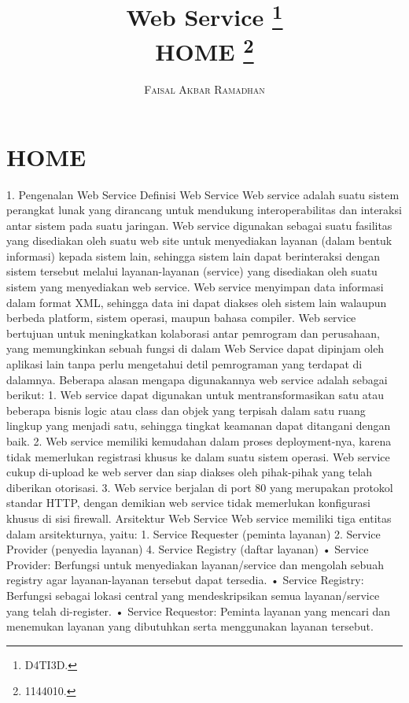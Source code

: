\documentclass[a4paper,11pt]{book}
\title{\Huge \textbf{Web Service}  \footnote{D4TI3D.} \\ \huge HOME \footnote{1144010.}}
\author{\textsc{Faisal Akbar Ramadhan}
}
\begin{document}
\maketitle

\chapter*{HOME}
1.	Pengenalan Web Service
Definisi Web Service
Web service adalah suatu sistem perangkat lunak yang dirancang untuk mendukung interoperabilitas dan interaksi antar sistem pada suatu jaringan. Web service digunakan sebagai suatu fasilitas yang disediakan oleh suatu web site untuk menyediakan layanan (dalam bentuk informasi) kepada sistem lain, sehingga sistem lain dapat berinteraksi dengan sistem tersebut melalui layanan-layanan (service) yang disediakan oleh suatu sistem yang menyediakan web service. Web service menyimpan data informasi dalam format XML, sehingga data ini dapat diakses oleh sistem lain walaupun berbeda platform, sistem operasi, maupun bahasa compiler.
Web service bertujuan untuk meningkatkan kolaborasi antar pemrogram dan perusahaan, yang memungkinkan sebuah fungsi di dalam Web Service dapat dipinjam oleh aplikasi lain tanpa perlu mengetahui detil pemrograman yang terdapat di dalamnya.
Beberapa alasan mengapa digunakannya web service  adalah sebagai berikut:
1. Web service dapat digunakan untuk mentransformasikan satu atau beberapa bisnis logic atau class dan objek yang terpisah dalam satu ruang lingkup yang menjadi satu, sehingga tingkat keamanan dapat ditangani dengan baik.
2. Web service memiliki kemudahan dalam proses deployment-nya, karena tidak memerlukan registrasi khusus ke dalam suatu sistem operasi. Web service cukup di-upload ke web server dan siap diakses oleh pihak-pihak yang telah diberikan otorisasi.
3. Web service berjalan di port  80 yang merupakan protokol standar HTTP, dengan demikian web service tidak memerlukan konfigurasi khusus di sisi firewall.
Arsitektur Web Service
Web service memiliki tiga entitas dalam arsitekturnya, yaitu:
1. Service Requester (peminta layanan)
2. Service Provider (penyedia layanan)
4. Service Registry (daftar layanan)
• Service Provider: Berfungsi untuk menyediakan layanan/service dan mengolah sebuah registry agar layanan-layanan tersebut dapat tersedia.
• Service Registry: Berfungsi sebagai lokasi central yang mendeskripsikan semua layanan/service yang telah di-register.
• Service Requestor: Peminta layanan yang mencari dan menemukan layanan yang dibutuhkan serta menggunakan layanan tersebut.
\end{document}
